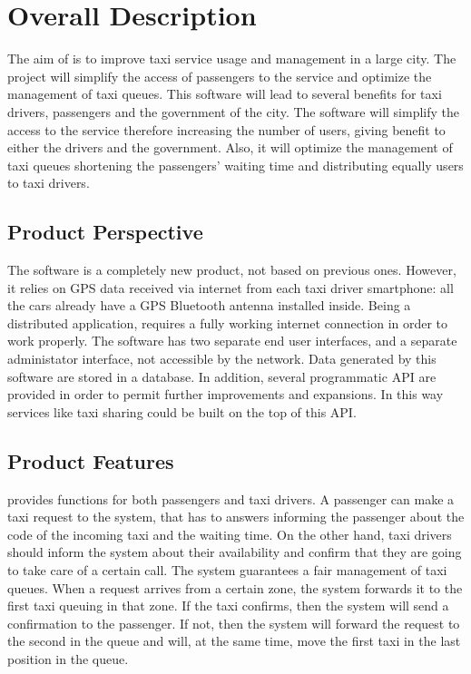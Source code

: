 \section{Overall Description}
The aim of \myTaxiService{} is to improve taxi service usage and management in a large city.
The project will simplify the access of passengers to the service and optimize the management of taxi queues.
This software will lead to several benefits for taxi drivers, passengers and the government of the city.
The software will simplify the access to the service therefore increasing the number of users, giving benefit to either the drivers and the government.
Also, it will optimize the management of taxi queues shortening the passengers’ waiting time and distributing equally users to taxi drivers.
\subsection{Product Perspective}
The \myTaxiService{} software is a completely new product, not based on previous ones.
However, it relies on GPS data received via internet from each taxi driver smartphone: all the cars already have a GPS Bluetooth antenna installed inside.
Being a distributed application, \myTaxiService{} requires a fully working internet connection in order to work properly.
The software has two separate end user interfaces, and a separate administator interface, not accessible by the network.
Data generated by this software are stored in a database.
In addition, several programmatic API are provided in order to permit further improvements and expansions. In this way services like taxi sharing could be built on the top of this API.
\subsection{Product Features}
\MyTaxyService{} provides functions for both passengers and taxi drivers.
A passenger can make a taxi request to the system, that has to answers informing the passenger about the code of the incoming taxi and the waiting time.
On the other hand, taxi drivers should inform the system about their availability and confirm that they are going to take care of a certain call. The system guarantees a fair management of taxi queues. When a request arrives from a certain zone, the system forwards it to the first taxi queuing in that zone. If the taxi confirms, then the system will send a confirmation to the passenger. If not, then the system will forward the request to the second in the queue and will, at the same time, move the first taxi in the last position in the queue.
